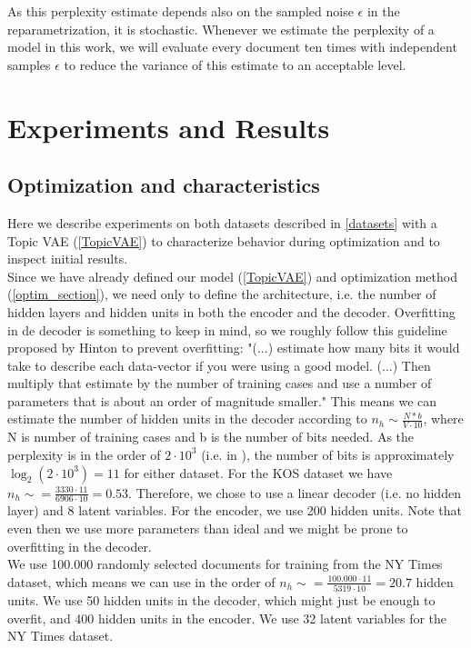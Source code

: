 \documentclass{report}
\begin{document}
	As this perplexity estimate depends also on the sampled noise $\epsilon$ in the reparametrization, it is stochastic. Whenever we estimate the perplexity of a model in this work, we will evaluate every document ten times with independent samples $\epsilon$ to reduce the variance of this estimate to an acceptable level.
	
	\section{Experiments and Results}
	
	
	\subsection{Optimization and characteristics}\label{exp1}
	
	Here we describe experiments on both datasets described in \ref{datasets} with a Topic VAE (\ref{TopicVAE}) to characterize behavior during optimization and to inspect initial results. \\
	Since we have already defined our model (\ref{TopicVAE}) and optimization method (\ref{optim_section}), we need only to define the architecture, i.e. the number of hidden layers and hidden units in both the encoder and the decoder. Overfitting in de decoder is something to keep in mind, so we roughly follow this guideline proposed by Hinton \cite{hinton2012neural} to prevent overfitting: "(...) estimate how many bits it would take to describe each data-vector if you were using a good model. (...) Then multiply that estimate by the number of training cases and use a number of parameters that is about an order of magnitude smaller." This means we can estimate the number of hidden units in the decoder according to $n_h \sim \frac{N*b}{V \cdot 10}$, where N is number of training cases and b is the number of bits needed. As the perplexity is in the order of $2 \cdot 10^3$ (i.e. in \cite{ranganath2015deep}), the number of bits is approximately $\log_2(2 \cdot 10^3) = 11$ for either dataset. For the KOS dataset we have $n_h \sim = \frac{3330 \cdot 11}{6906\cdot 10} = 0.53$. Therefore, we chose to use a linear decoder (i.e. no hidden layer) and 8 latent variables. For the encoder, we use 200 hidden units. Note that even then we use more parameters than ideal and we might be prone to overfitting in the decoder. \\
	We use 100.000 randomly selected documents for training from the NY Times dataset, which means we can use in the order of $n_h \sim = \frac{100.000 \cdot 11}{5319\cdot 10} = 20.7$ hidden units. We use 50 hidden units in the decoder, which might just be enough to overfit, and 400 hidden units in the encoder. We use 32 latent variables for the NY Times dataset. \\
\end{document}
